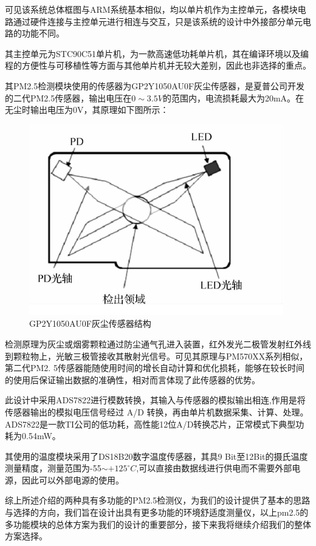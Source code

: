 \documentclass[a4paper, 11pt]{article} %
\begin{document}
\par{} 可见该系统总体框图与ARM系统基本相似，均以单片机作为主控单元，各模块电路通过硬件连接与主控单元进行相连与交互，只是该系统的设计中外接部分单元电路的功能不同。
\par{} 其主控单元为STC90C51单片机，为一款高速低功耗单片机，其在编译环境以及编程的方便性与可移植性等方面与其他单片机并无较大差别，因此也非选择的重点。
\par{} 其PM2.5检测模块使用的传感器为GP2Y1050AU0F灰尘传感器，是夏普公司开发的二代PM2.5传感器\cite{GP2Y1050}，输出电压在$0\sim 3.5V$的范围内，电流损耗最大为20mA。在无尘时输出电压为0V，其原理如下图所示：
\begin{figure}[H]
  \centering
  \includegraphics[scale = 0.65 ]{1-5.png}
  \caption{GP2Y1050AU0F灰尘传感器结构}
  \label{img5} 
\end{figure}
\par{} 检测原理为灰尘或烟雾颗粒通过防尘通气孔进入装置，红外发光二极管发射红外线到颗粒物上，光敏三极管接收其散射光信号。可见其原理与PM570XX系列相似，第二代PM2. 5传感器能随使用时间的增长自动计算和优化损耗\cite{wl2016dgn}，能够在较长时间的使用后保证输出数据的准确性，相对而言体现了此传感器的优势。
\par{} 此设计中采用ADS7822进行模数转换，其输入与传感器的模拟输出相连,作用是将传感器输出的模拟电压信号经过 A/D 转换，再由单片机数据采集、计算、处理。ADS7822是一款TI公司的低功耗，高性能12位A/D转换芯片，正常模式下典型功耗为0.54mW。
\par{} 其使用的温度模块采用了DS18B20数字温度传感器，其具9 Bit至12Bit的摄氏温度测量精度，测量范围为-55$\sim +125^{\circ}C$,可以直接由数据线进行供电而不需要外部电源，因此可以外部电源的使用。
\par{} 综上所述介绍的两种具有多功能的PM2.5检测仪，为我们的设计提供了基本的思路与选择的方向，我们旨在设计出具有更多功能的环境舒适度测量仪，以上pm2.5的多功能模块的总体方案为我们的设计的重要部分，接下来我将继续介绍我们的整体方案选择。
\end{document}
